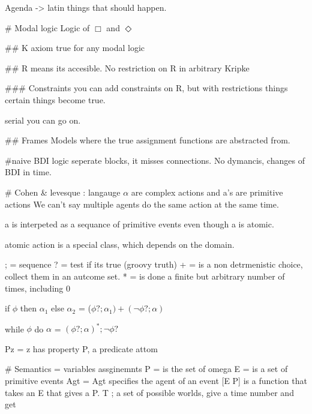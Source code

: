 Agenda -> latin things that should happen.

# Modal logic
Logic of $\Box$ and $\Diamond$

## K axiom
true for any modal logic

## R
means its accesible. No restriction on R in arbitrary Kripke


### Constraints
you can add constraints on R, but with restrictions things certain
things become true.

serial you can go on.

## Frames
Models where the true assignment functions are abstracted from.

#naive BDI logic
seperate blocks, it misses connections.
No dymancis, changes of BDI in time.

# Cohen & levesque : langauge
$\alpha$ are complex actions and a's are primitive actions
We can't say multiple agents do the same action at the same time.

a is interpeted as a sequance of primitive events even though a is
atomic.

atomic action is a special class, which depends on the domain.

; = sequence
? = test if its true (groovy truth)
+ = is a non detrmenistic choice, collect them in an autcome set.
* = is done a finite but arbitrary number of times, including 0

if $\phi$ then $\alpha_1$ else
$\alpha_2$ = ($\phi? ; \alpha_1) + (\neg \phi?;\alpha)$

while $\phi$ do $\alpha$ = $(\phi?;\alpha)^*;\neg\phi?$

Pz = z has property P, a predicate attom


# Semantics
\omega = variables assginemnts
P = is the set of omega \in \omega
E = is a set of primitive events
Agt = Agt \in [E \to p] specifies the agent of an event [E \to P] is a
function that takes an E that gives a P.
T \subset [Z \to E]; a set of possible worlds, give a time number and get



